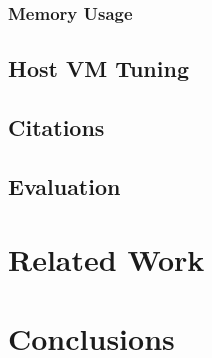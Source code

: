 \documentclass{acm_proc_article-sp}
\begin{document}
\subsubsection{Memory Usage}

\subsection{Host VM Tuning}

\subsection{Citations}

\subsection{Evaluation}

\section{Related Work}

\section{Conclusions}


\end{document}
